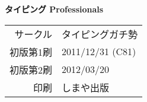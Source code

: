 \documentclass[a4j,twoside,twocolumn]{jsarticle}
\begin{document}
\clearpage





\clearpage

\thispagestyle{empty}
\section*{} %

\clearpage
\thispagestyle{empty}
\section*{} %
\vfill{}

\begin{Large}
\textsf{\textbf{タイピング Professionals}}
\end{Large}

\hrulefill
\vspace{2mm}

\begin{tabular}{rl}
\textsf{サークル}& タイピングガチ勢 \\
\textsf{初版第1刷}& 2011/12/31 (C81) \\
\textsf{初版第2刷}& 2012/03/20 \\
\textsf{印刷}& しまや出版 \\
\end{tabular}

\vspace{2mm}
\hrulefill
\end{document}
